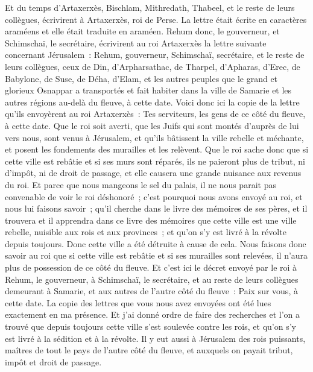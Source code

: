 \begin{multicols}{2}
Et du temps d'Artaxerxès, Bischlam, Mithredath, Thabeel, et le reste de leurs collègues, écrivirent à Artaxerxès, roi de Perse. La lettre était écrite en caractères araméens et elle était traduite en araméen.
Rehum donc, le gouverneur, et Schimschaï, le secrétaire, écrivirent au roi Artaxerxès la lettre suivante concernant Jérusalem~:
Rehum, gouverneur, Schimschaï, secrétaire, et le reste de leurs collègues, ceux de Din, d'Arpharsathac, de Tharpel, d'Apharas, d'Erec, de Babylone, de Suse, de Déha, d'Elam,
et les autres peuples que le grand et glorieux Osnappar a transportés et fait habiter dans la ville de Samarie et les autres régions au-delà du fleuve, à cette date.
Voici donc ici la copie de la lettre qu'ils envoyèrent au roi Artaxerxès~: Tes serviteurs, les gens de ce côté du fleuve, à cette date.
Que le roi soit averti, que les Juifs qui sont montés d'auprès de lui vers nous, sont venus à Jérusalem, et qu'ils bâtissent la ville rebelle et méchante, et posent les fondements des murailles et les relèvent. 
Que le roi sache donc que si cette ville est rebâtie et si ses murs sont réparés, ils ne paieront plus de tribut, ni d'impôt, ni de droit de passage, et elle causera une grande nuisance aux revenus du roi.
Et parce que nous mangeons le sel du palais, il ne nous parait pas convenable de voir le roi déshonoré~; c'est pourquoi nous avons envoyé au roi, et nous lui faisons savoir~;
qu'il cherche dans le livre des mémoires de ses pères, et il trouvera et il apprendra dans ce livre des mémoires que cette ville est une ville rebelle, nuisible aux rois et aux provinces~; et qu'on s'y est livré à la révolte depuis toujours. Donc cette ville a été détruite à cause de cela.
Nous faisons donc savoir au roi que si cette ville est rebâtie et si ses murailles sont relevées, il n'aura plus de possession de ce côté du fleuve.
Et c'est ici le décret envoyé par le roi à Rehum, le gouverneur, à Schimschaï, le secrétaire, et au reste de leurs collègues demeurant à Samarie, et aux autres de l'autre côté du fleuve~: Paix sur vous, à cette date.
La copie des lettres que vous nous avez envoyées ont été lues exactement en ma présence.
Et j'ai donné ordre de faire des recherches et l'on a trouvé que depuis toujours cette ville s'est soulevée contre les rois, et qu'on s'y est livré à la sédition et à la révolte.
Il y eut aussi à Jérusalem des rois puissants, maîtres de tout le pays de l'autre côté du fleuve, et auxquels on payait tribut, impôt et droit de passage.

\end{multicols}
